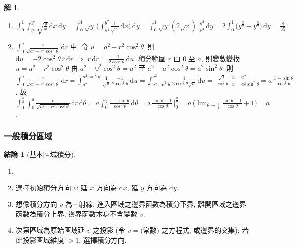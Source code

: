 \documentclass[12pt]{extarticle}
\newcommand{\ds}{\displaystyle}
\newcommand{\ie}{\;\Longrightarrow\;}
\theoremstyle{definition}
\newtheorem*{fact}{結論}
\newtheorem*{sol}{解}
\begin{document}
\begin{sol}
\begin{enumerate}
    \item $\ds\int_0^1\!\int_{y^4}^{y^2}\!\!\sqrt{\frac{y}{x}}\,\text{d}x\,\text{d}y = \int_0^1\!\sqrt{y}\,\bigg(\int_{y^4}^{y^2}\!\!\frac{1}{\sqrt{x}}\,\text{d}x\bigg)\,\text{d}y = \int_0^1\!\sqrt{y}\,(2\sqrt{x})\,\Big|_{y^4}^{y^2}\,\text{d}y = 2\int_0^1\!\big(y^{\frac{3}{2}} - y^{\frac{5}{2}}\big)\,\text{d}y = \frac{8}{35}$ %
    \item $\ds\int_0^a\!\frac{r}{\sqrt{a^2 - r^2\cos^2\theta}}\,\text{d}r$ 中, 令 $\ds u = a^2 - r^2\cos^2\theta$, 則 $\ds\text{d}u = -2\cos^2\theta\,r\,\text{d}r\ie r\,\text{d}r = \frac{-1}{2\cos^2\theta}\,\text{d}u$. 積分範圍 $r$ 由 $0$ 至 $a$, 則變數變換 $u = a^2 - r^2\cos^2\theta$ 由 $a^2 - 0^2\cos^2\theta = a^2$ 至 $a^2 - a^2\cos^2\theta = a^2\sin^2\theta$. 則 $\ds\int_0^a\!\frac{r}{\sqrt{a^2 - r^2\cos^2\theta}}\,\text{d}r = \int_{a^2}^{a^2\sin^2\theta}\!\!\frac{1}{\sqrt{u}}\,\frac{-1}{2\cos^2\theta}\,\text{d}u = \int_{a^2\sin^2\theta}^{a^2}\frac{1}{2\cos^2\theta\sqrt{u}}\,\text{d}u = \frac{\sqrt{u}}{\cos^2\theta}\,\Big|_{u = a^2\sin^2\theta}^{u = a^2} = a\,\frac{1 - \sin\theta}{\cos^2\theta}$. 故 $\ds\int_0^{\frac{\pi}{2}}\!\!\int_0^a\!\frac{r}{\sqrt{a^2 - r^2\cos^2\theta}}\,\text{d}r\,\text{d}\theta = a\int_0^{\frac{\pi}{2}}\frac{1 - \sin\theta}{\cos^2\theta}\,\text{d}\theta = a\,\frac{\sin\theta - 1}{\cos\theta}\,\Big|_0^{\frac{\pi}{2}} = a\,\Big(\lim_{\theta\to\frac{\pi}{2}}\frac{\sin\theta - 1}{\cos\theta} + 1\Big) = a$.  
  \end{enumerate}
\end{sol}

\subsubsection*{一般積分區域}

\begin{fact}[基本區域積分]
  \begin{enumerate}\setlength{\itemsep}{0pt}
    \item[]
    \item 選擇初始積分方向 $v$: 延 $x$ 方向為 $\text{d}x$, 延 $y$ 方向為 $\text{d}y$. 
    \item 想像積分方向 $v$ 為一射線, 進入區域之邊界函數為積分下界, 離開區域之邊界函數為積分上界; 邊界函數本身不含變數 $v$. 
    \item 次第區域為原始區域延 $v$ 之投影 (令 $v = \text{(常數)}$ 之方程式, 或邊界的交集); 若此投影區域維度 $> 1$, 選擇積分方向. 
  \end{enumerate}
\end{fact}
\end{document}
